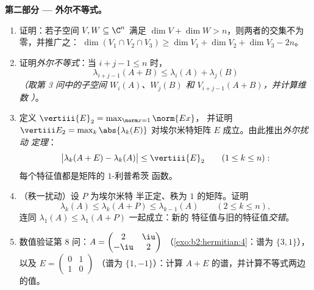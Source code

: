 \begin{problem}
\medskip
\noindent\textbf{第二部分 --- 外尔不等式。}
\begin{enumerate}[resume]
  \item 证明：若子空间 $V, W \subseteq \C^n$ 满足 $\dim V
        + \dim W > n$，则两者的交集不为零，并推广之：
        $\dim(V_1 \cap V_2 \cap V_3) \geq \dim V_1 + \dim V_2 +
        \dim V_3 - 2n$。
  \item 证明\emph{外尔不等式}：当 $i + j - 1 \leq n$ 时，
        \[
        \lambda_{i+j-1}(A + B) \leq \lambda_i(A) +
        \lambda_j(B)
        \]
        \emph{（取第 3 问中的子空间 $W_i(A)$、$W_j(B)$ 和
        $V_{i+j-1}(A+B)$，并计算维数
        ）}。
  \item 定义 $\vertiii{E}_2 = \max_{\norm x = 1}\norm{Ex}$，
        并证明 $\vertiii E_2 = \max_k\abs{\lambda_k(E)}$ 对埃尔米特矩阵
        $E$ 成立。由此推出\emph{外尔扰动
        定理}：
        \[
        \bigl|\lambda_k(A + E) - \lambda_k(A)\bigr| \leq
        \vertiii{E}_2
        \qquad (1 \leq k \leq n) :
        \]
        每个特征值都是矩阵的 $1$-利普希茨
        函数。
  \item （秩一扰动）设 $P$ 为埃尔米特
        半正定、秩为 $1$ 的矩阵。证明
        \[
        \lambda_k(A) \leq \lambda_k(A + P) \leq
        \lambda_{k-1}(A) \qquad (2 \leq k \leq n),
        \]
        连同 $\lambda_1(A) \leq \lambda_1(A+P)$ 一起成立：新的
        特征值与旧的特征值\emph{交错}。
  \item 数值验证第 8 问：$A = \begin{pmatrix} 2 &
        \iu\\ -\iu & 2\end{pmatrix}$
        （\cref{exo:b2:hermitian:4}：谱为 $\{3, 1\}$），以及
        $E = \begin{pmatrix} 0 & 1\\ 1 & 0\end{pmatrix}$
        （谱为 $\{1, -1\}$）：计算 $A +
        E$ 的谱，并计算不等式两边的值。
\end{enumerate}


\end{problem}
